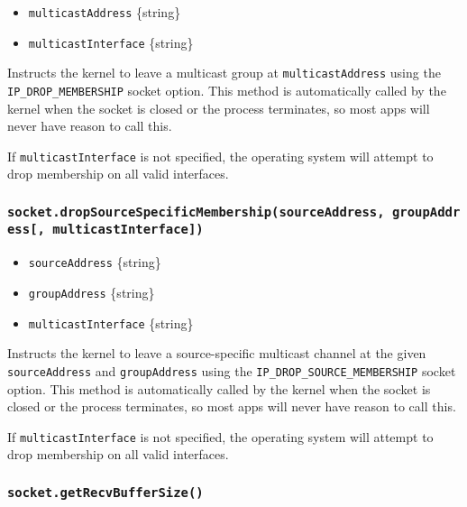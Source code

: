 \begin{itemize}
\tightlist
\item
  \texttt{multicastAddress} \{string\}
\item
  \texttt{multicastInterface} \{string\}
\end{itemize}

Instructs the kernel to leave a multicast group at
\texttt{multicastAddress} using the \texttt{IP\_DROP\_MEMBERSHIP} socket
option. This method is automatically called by the kernel when the
socket is closed or the process terminates, so most apps will never have
reason to call this.

If \texttt{multicastInterface} is not specified, the operating system
will attempt to drop membership on all valid interfaces.

\subsubsection{\texorpdfstring{\texttt{socket.dropSourceSpecificMembership(sourceAddress,\ groupAddress{[},\ multicastInterface{]})}}{socket.dropSourceSpecificMembership(sourceAddress, groupAddress{[}, multicastInterface{]})}}\label{socket.dropsourcespecificmembershipsourceaddress-groupaddress-multicastinterface}

\begin{itemize}
\tightlist
\item
  \texttt{sourceAddress} \{string\}
\item
  \texttt{groupAddress} \{string\}
\item
  \texttt{multicastInterface} \{string\}
\end{itemize}

Instructs the kernel to leave a source-specific multicast channel at the
given \texttt{sourceAddress} and \texttt{groupAddress} using the
\texttt{IP\_DROP\_SOURCE\_MEMBERSHIP} socket option. This method is
automatically called by the kernel when the socket is closed or the
process terminates, so most apps will never have reason to call this.

If \texttt{multicastInterface} is not specified, the operating system
will attempt to drop membership on all valid interfaces.

\subsubsection{\texorpdfstring{\texttt{socket.getRecvBufferSize()}}{socket.getRecvBufferSize()}}\label{socket.getrecvbuffersize}

